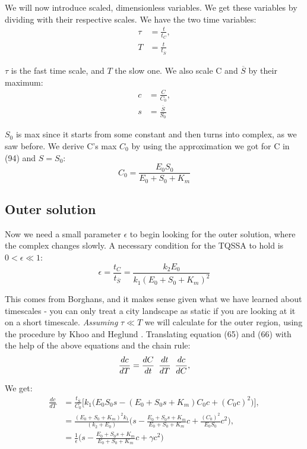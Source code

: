 \documentclass[12pt]{article}
\begin{document}
We will now introduce scaled, dimensionless variables. We get these variables by
dividing with their respective scales. We have the two time variables:
\begin{align}
\tau &= \frac{t}{t_C}, \\
T &= \frac{t}{t_{\overline{S}}}
\end{align}

$\tau$ is the fast time scale, and $T$ the slow one. We also scale C and
$\overline{S}$ by their maximum:
\begin{align}
c &= \frac{C}{C_0}, \\
s &= \frac{\overline{S}}{S_0}
\end{align}

$S_0$ is max since it starts from some constant and then turns into
complex, as we saw before. We derive C's max $C_0$ by using the
approximation we got for C in (94) and $S=S_0$:
\begin{equation}
C_0 = \frac{E_0 S_0}{E_0 + S_0 + K_m}
\end{equation}

\subsection{Outer solution}

Now we need a small parameter $\epsilon$ to begin looking for the
outer solution, where the complex changes slowly. A necessary
condition for the TQSSA to hold is $0 < \epsilon \ll 1$:
\begin{equation}
\epsilon = \frac{t_C}{t_{\overline{S}}} = \frac{k_2 E_0}{k_1(E_0+S_0+K_m)^2}
\end{equation}

This comes from Borghans, and it makes sense given what we have
learned about timescales - you can only treat a city landscape as
static if you are looking at it on a short
timescale. \textit{Assuming} $\tau \ll T$ we will calculate for the
outer region, using the procedure by Khoo and Heglund
\cite{khoo2008total}. Translating equation (65) and (66) with the help
of the above equations and the chain rule:
\begin{equation}
\frac{dc}{dT} = \frac{dC}{dt} \enskip \frac{dt}{dT} \enskip \frac{dc}{dC},
\end{equation}

We get:
\begin{align}
\frac{dc}{dT} &= \frac{t_{\overline{S}}}{C_0}
       \Big[k_1 \Big(E_0 S_0 s - (E_0 + S_0 s + K_m) C_0 c + (C_0 c)^2
                   \Big)\Big], \\
              &= \frac{(E_0+S_0+K_m)^2 k_1}{(k_2 + E_0)}
                 \Big(s - \frac{E_0+S_0 s+K_m}{E_0 + S_0 + K_m} c
                        + \frac{(C_0)^2}{E_0 S_0} c^2 \Big), \\
              &= \frac{1}{\epsilon}
                 \Big(s - \frac{E_0+S_0 s+K_m}{E_0 + S_0 + K_m} c
                        +  \gamma c^2 \Big)
\end{align}
\end{document}
